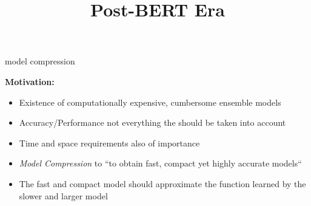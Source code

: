 



\newcommand{\titlefigure}{figure/54-distillation.png}
\newcommand{\learninggoals}{
\item soft vs. hard targets
\item understand how distillation works
\item DistilBERT
\item other approaches towards compression}

\title{Post-BERT Era}
\date{}




\begin{frame}{model compression}

\vfill

\textbf{Motivation:} 

\begin{itemize}
				\item Existence of computationally expensive, cumbersome ensemble models
				\item Accuracy/Performance not everything the should be taken into account
				\item Time and space requirements also of importance
				\item \textit{Model Compression} to ``to obtain fast, compact yet highly accurate models``
				\item The fast and compact model should approximate the function learned by the slower and larger model
\end{itemize}

\vfill

\end{frame}


